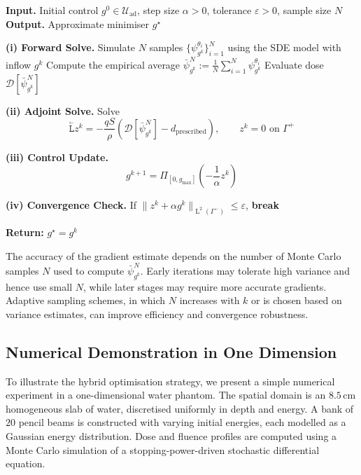 \documentclass{amsart}
\newcommand{\bL}{\stackrel{_\leftarrow}{\mathtt L}}
\theoremstyle{plain}
\newcommand{\leb}{\text{Leb}}
\newcommand{\LL}{\ensuremath{\operatorname L}\xspace}
\renewcommand{\leb}[1]{\ensuremath{\LL^{#1}}}
\begin{document}
\begin{algorithm}[h!]
  \caption{Hybrid SDE-PDE Optimisation Algorithm}
  \label{alg:hybrid}
  \begin{algorithmic}[1]
    \State \textbf{Input.} Initial control $g^0 \in \mathcal{U}_{\mathrm{ad}}$, step size $\alpha > 0$, tolerance $\varepsilon > 0$, sample size $N$
    \State \textbf{Output.} Approximate minimiser $g^\star$
    
    \While{$\| z^k + \alpha g^k \|_{\leb2(\Gamma^-)} > \varepsilon$}
    
      \State \textbf{(i) Forward Solve.} Simulate $N$ samples $\{\psi^{\theta_i}_{g^k}\}_{i=1}^N$ using the SDE model with inflow $g^k$
      \State \hspace{1em} Compute the empirical average $\bar{\psi}^N_{g^k} := \frac{1}{N} \sum_{i=1}^N \psi^{\theta_i}_{g^k}$
      \State \hspace{1em} Evaluate dose $\mathcal{D}[\bar{\psi}^N_{g^k}]$
    
      \State \textbf{(ii) Adjoint Solve.} Solve
      \[
      \bL z^k = -\frac{q S}{\rho} \left( \mathcal{D}[\bar{\psi}^N_{g^k}] - d_{\text{prescribed}} \right), \qquad z^k = 0 \text{ on } \Gamma^+
      \]
    
      \State \textbf{(iii) Control Update.}
      \[
      g^{k+1} = \Pi_{[0, g_{\max}]} \left( -\frac{1}{\alpha} z^k \right)
      \]
    
      \State \textbf{(iv) Convergence Check.} If $\| z^k + \alpha g^k \|_{\leb2(\Gamma^-)} \leq \varepsilon$, \textbf{break}
    
    \EndWhile
    \State \textbf{Return:} $g^\star = g^k$
  \end{algorithmic}
\end{algorithm}

The accuracy of the gradient estimate depends on the number of Monte
Carlo samples $N$ used to compute $\bar{\psi}_{g^k}^N$. Early
iterations may tolerate high variance and hence use small $N$, while
later stages may require more accurate gradients. Adaptive sampling
schemes, in which $N$ increases with $k$ or is chosen based on
variance estimates, can improve efficiency and convergence robustness.

\subsection{Numerical Demonstration in One Dimension}
\label{subsec:numerical-1d}

To illustrate the hybrid optimisation strategy, we present a simple
numerical experiment in a one-dimensional water phantom. The spatial
domain is an $8.5\,\mathrm{cm}$ homogeneous slab of water, discretised
uniformly in depth and energy. A bank of $20$ pencil beams is
constructed with varying initial energies, each modelled as a Gaussian
energy distribution. Dose and fluence profiles are computed using a
Monte Carlo simulation of a stopping-power-driven stochastic
differential equation.
\end{document}

